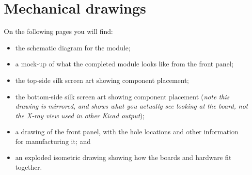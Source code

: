 
%
%
%
%
%
%

\chapter{Mechanical drawings}

On the following pages you will find:
\begin{itemize}
  \item the schematic diagram for the module;
  \item a mock-up of what the completed module looks like from the front
    panel;
  \item the top-side silk screen art showing component placement;
  \item the bottom-side silk screen art showing component placement
    (\emph{note this drawing is mirrored, and shows what you actually see
    looking at the board, not the X-ray view used in other Kicad output});
  \item a drawing of the front panel, with the hole locations and other
    information for manufacturing it; and
  \item an exploded isometric drawing showing how the boards and hardware
    fit together.
\end{itemize}

\clearpage


\thispagestyle{empty}
\onecolumn
\vspace*{\fill}\begin{center}
\setlength{\fboxsep}{0pt}%
\setlength{\fboxrule}{1pt}%
\end{center}
\vspace*{\fill}

\clearpage



\clearpage\label{fig:exploded}

